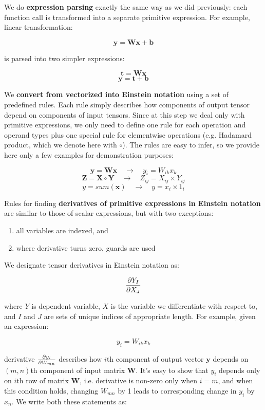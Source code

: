 \documentclass[conference]{IEEEtran}
\begin{document}
We do \textbf{expression parsing} exactly the same way as we did
previously: each function call is transformed into a separate
primitive expression. For example, linear transformation:

$$\pmb{y} = \pmb{Wx} + \pmb{b}$$ 

is parsed into two simpler expressions:

$$\pmb{t} = \pmb{Wx}$$
$$\pmb{y} = \pmb{t} + \pmb{b}$$

We \textbf{convert from vectorized into Einstein notation} using a set
of predefined rules. Each rule simply describes how components of
output tensor depend on components of input tensors. Since at this
step we deal only with primitive expressions, we only need to define
one rule for each operation and operand types plus one special rule
for elementwise operations (e.g. Hadamard product, which we denote
here with $\circ$). The rules are easy to infer, so we provide here
only a few examples for demonstration purposes:

$$\pmb{y} = \pmb{Wx} \quad \rightarrow \quad y_i = W_{ik}x_k$$
$$\pmb{Z} = \pmb{X} \circ \pmb{Y} \quad \rightarrow \quad Z_{ij} = X_{ij} \times Y_{ij}$$
$$y = sum(\pmb{x}) \quad \rightarrow \quad y = x_i \times 1_i$$


Rules for finding \textbf{derivatives of primitive expressions in
  Einstein notation} are similar to those of scalar expressions, but
with two exceptions:

\begin{enumerate}
\item all variables are indexed, and
\item where derivative turns zero, guards are used
\end{enumerate}

We designate tensor derivatives in Einstein notation as:

$$\pdv{Y_I}{X_J}$$

where $Y$ is dependent variable, $X$ is the variable we differentiate
with respect to, and $I$ and $J$ are sets of unique indices of
appropriate length. For example, given an expression:

$$y_i = W_{ik}x_k$$

derivative $\pdv{y_i}{W_{mn}}$ describes how $i$th component of output
vector $\pmb{y}$ depends on $(m, n)$th component of input matrix
$\pmb{W}$. It's easy to show that $y_i$ depends only on $i$th row of
matrix $\pmb{W}$, i.e. derivative is non-zero only when $i = m$, and
when this condition holds, changing $W_{mn}$ by 1 leads to
corresponding change in $y_i$ by $x_n$. We write both these statements
as:
\end{document}
